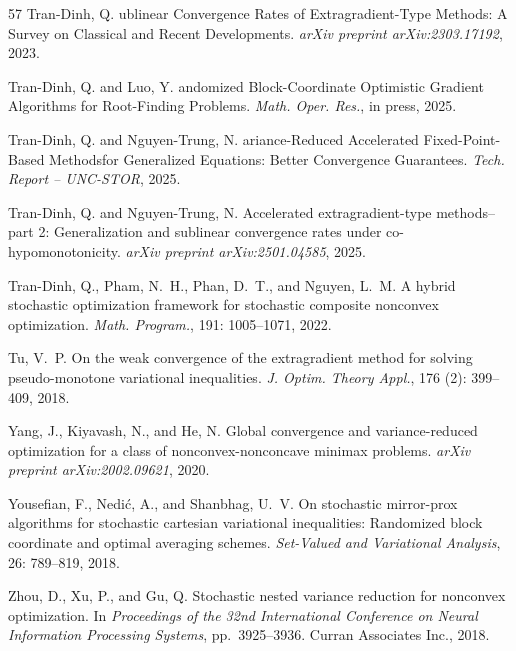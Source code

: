 \documentclass{article}
\theoremstyle{plain}
\theoremstyle{definition}
\theoremstyle{remark}
\begin{document}
\begin{thebibliography}{57}
Tran-Dinh, Q.
ublinear {C}onvergence {R}ates of {E}xtragradient-{T}ype
  {M}ethods: {A} {S}urvey on {C}lassical and {R}ecent {D}evelopments.
\newblock \emph{arXiv preprint arXiv:2303.17192}, 2023.

Tran-Dinh, Q. and Luo, Y.
andomized {B}lock-{C}oordinate {O}ptimistic {G}radient
  {A}lgorithms for {R}oot-{F}inding {P}roblems.
\newblock \emph{Math. Oper. Res.}, in press, 2025.

Tran-Dinh, Q. and Nguyen-Trung, N.
ariance-{R}educed {A}ccelerated {F}ixed-{P}oint-{B}ased
  {M}ethodsfor {G}eneralized {E}quations: {B}etter {C}onvergence {G}uarantees.
\newblock \emph{Tech. Report -- UNC-STOR}, 2025{}.

Tran-Dinh, Q. and Nguyen-Trung, N.
\newblock Accelerated extragradient-type methods--part 2: Generalization and
  sublinear convergence rates under co-hypomonotonicity.
\newblock \emph{arXiv preprint arXiv:2501.04585}, 2025{}.

Tran-Dinh, Q., Pham, N.~H., Phan, D.~T., and Nguyen, L.~M.
\newblock A hybrid stochastic optimization framework for stochastic composite
  nonconvex optimization.
\newblock \emph{Math. Program.}, 191: 1005--1071, 2022.

Tu, V.~P.
\newblock On the weak convergence of the extragradient method for solving
  pseudo-monotone variational inequalities.
\newblock \emph{J. Optim. Theory Appl.}, 176 (2): 399--409,
  2018.

Yang, J., Kiyavash, N., and He, N.
\newblock Global convergence and variance-reduced optimization for a class of
  nonconvex-nonconcave minimax problems.
\newblock \emph{arXiv preprint arXiv:2002.09621}, 2020.

Yousefian, F., Nedi{\'c}, A., and Shanbhag, U.~V.
\newblock On stochastic mirror-prox algorithms for stochastic cartesian
  variational inequalities: {R}andomized block coordinate and optimal averaging
  schemes.
\newblock \emph{Set-Valued and Variational Analysis}, 26: 789--819,
  2018.

Zhou, D., Xu, P., and Gu, Q.
\newblock Stochastic nested variance reduction for nonconvex optimization.
\newblock In \emph{Proceedings of the 32nd International Conference on Neural
  Information Processing Systems}, pp.\  3925--3936. Curran Associates Inc.,
  2018.

\end{thebibliography}

%
\end{document}
